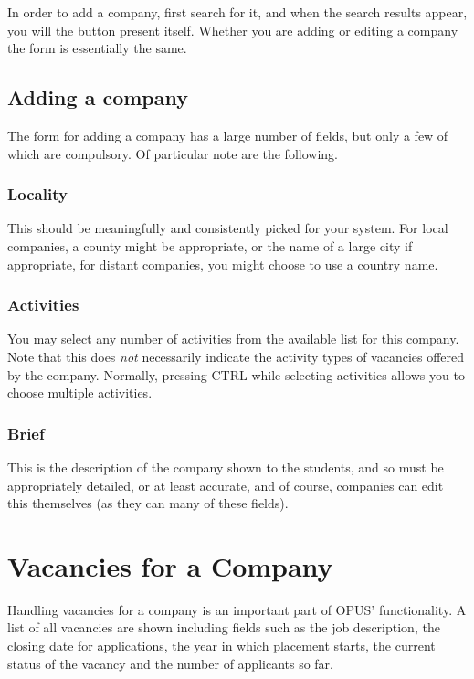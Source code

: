 \documentclass[12 pt]{book}
\begin{document}
In order to add a company, first search for it, and when the search results
appear, you will the  button present itself. Whether you are 
adding or editing a company the form is essentially the same.

\subsection{Adding a company}

The form for adding a company has a large number of fields, but only a few of
which are compulsory. Of particular note are the following.

\subsubsection{Locality}

This should be meaningfully and consistently picked for your system. For
local companies, a county might be appropriate, or the name of a large city
if appropriate, for distant companies, you might choose to use a country name.

\subsubsection{Activities}

You may select any number of activities from the available list for this
company. Note that this does \emph{not} necessarily indicate the activity 
types of vacancies offered by the company. Normally, pressing CTRL while
selecting activities allows you to choose multiple activities.

\subsubsection{Brief}

This is the description of the company shown to the students, and so must
be appropriately detailed, or at least accurate, and of course, companies can
edit this themselves (as they can many of these fields).

\section{Vacancies for a Company}

Handling vacancies for a company is an important part of OPUS' functionality.
A list of all vacancies are shown including fields such as the job description,
the closing date for applications, the year in which placement starts, the
current status of the vacancy and the number of applicants so far.
\end{document}
